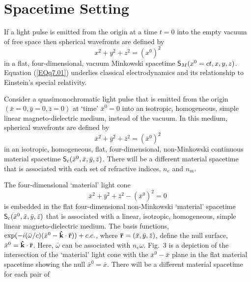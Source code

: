 \documentclass[twocolumn,amssymb,eqsecnum,aps,pra]{revtex4-2}
\begin{document}
\section{Spacetime Setting}
\par
If a light pulse is emitted from the origin at a time $t=0$ into the
empty vacuum of free space then spherical wavefronts are defined by 
\begin{equation}
x^2+y^2+z^2=(x^0)^2
\label{EQq7.01}
\end{equation}
in a flat, four-dimensional, vacuum Minkowski spacetime
${\sf S}_M(x^0=ct,x,y,z)$.
Equation (\ref{EQq7.01}) underlies classical electrodynamics and its
relationship to Einstein's special relativity.
\par
Consider a quasimonochromatic light pulse that is emitted from the
origin $(\bar x=0,\bar y=0,\bar z=0)$ at `time' $\bar x^0=0$ into an
isotropic, homogeneous, simple linear magneto-dielectric medium,
instead of the vacuum.
In this medium, spherical wavefronts are defined by
\begin{equation}
\bar x^2+\bar y^2+\bar z^2=(\bar x^0)^2
\label{EQq7.02}
\end{equation}
in an isotropic, homogeneous, flat, four-dimensional, non-Minkowski
continuous material
spacetime ${\sf S}_c(\bar x^0,\bar x,\bar y,\bar z)$.
There will be a different material spacetime that is associated with
each set of refractive indices, $n_e$ and $n_m$.
\par
The four-dimensional `material' light cone 
\begin{equation}
\bar x^2+\bar y^2+\bar z^2-(\bar x^0)^2=0 
\label{EQq7.03}
\end{equation}
is embedded in the flat four-dimensional non-Minkowski `material'
spacetime ${\sf S}_c(\bar x^0,\bar x,\bar y,\bar z)$ that is
associated with a linear, isotropic, homogeneous, simple linear
magneto-dielectric medium.
The basis functions,
$\exp(-i(\bar\omega/c)(\bar x^0-{\bf \hat k}\cdot{\bf \bar r}))+c.c.$,
where ${\bf\bar r}=(\bar x,\bar y,\bar z)$,
define the null surface, $\bar x^0={\bf \hat k}\cdot{\bf \bar r}$.
Here, $\bar \omega$ can be associated with $n_e \omega$.
Fig.~3 is a depiction of the intersection of the `material' light cone
with the $\bar x^0-\bar x$ plane in the flat material spacetime showing
the null $\bar x^0=\bar x$.
There will be a different material spacetime for each pair of
\end{document}
